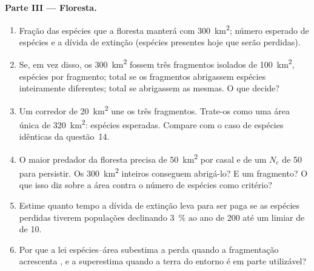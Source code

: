 \begin{problem}
\medskip
\noindent\textbf{Parte III --- Floresta.}
\begin{enumerate}[resume]
  \item Fração das espécies que a floresta manterá com \qty{300}{km^2};
        número esperado de espécies e a dívida de extinção (espécies
        presentes hoje que serão perdidas).
  \item Se, em vez disso, os \qty{300}{km^2} fossem três fragmentos
        isolados de \qty{100}{km^2}, espécies por fragmento; total se os
        fragmentos abrigassem espécies inteiramente diferentes; total se
        abrigassem as mesmas. O que decide?
  \item Um corredor de \qty{20}{km^2} une os três fragmentos. Trate-os
        como uma área única de \qty{320}{km^2}: espécies esperadas.
        Compare com o caso de espécies idênticas da questão~14.
  \item O maior predador da floresta precisa de \qty{50}{km^2} por casal
        e de um $N_{e}$ de 50 para persistir. Os \qty{300}{km^2} inteiros
        conseguem abrigá-lo? E um fragmento? O que isso diz sobre a área
        contra o número de espécies como critério?
  \item Estime quanto tempo a dívida de extinção leva para ser paga se as
        espécies perdidas tiverem populações declinando \qty{3}{\%} ao
        ano de 200 até um limiar de  de 10.
  \item Por que a lei espécies--área subestima a perda quando a
        fragmentação acrescenta , e a superestima quando
        a terra do entorno é em parte utilizável?
\end{enumerate}


\end{problem}
